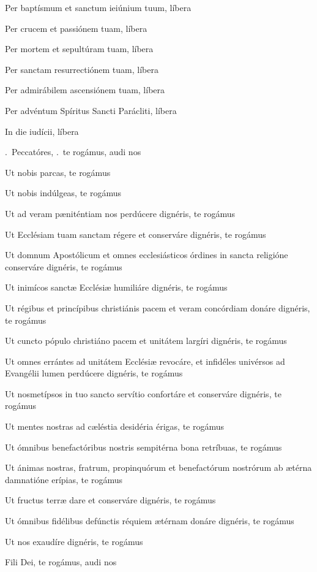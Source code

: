 \documentclass[12pt,a6paper]{book}
\makeatletter
\DeclareRobustCommand{\V}{\textbf{\vers@resp{-0.1em}{V}}.~}
\DeclareRobustCommand{\R}{\textbf{\vers@resp{0pt}{R}}.~}
\newcommand{\vers@resp@sym}{\raisebox{0.2ex}{\rotatebox[origin=c]{-20}{$\m@th\rceil$}}}
\newcommand{\vers@resp}[2]{%
  {\ooalign{\hidewidth\kern#1\vers@resp@sym\hidewidth\cr#2\cr}}%
}
\makeatother
\begin{document}
\begin{sloppy}
Per baptísmum et sanctum ieiúnium tuum, líbera

Per crucem et passiónem tuam, líbera

Per mortem et sepultúram tuam, líbera

Per sanctam resurrectiónem tuam, líbera

Per admirábilem ascensiónem tuam, líbera

Per advéntum Spíritus Sancti Parácliti, líbera

In die iudícii, líbera

\vspace{3mm}

\V Peccatóres, 
\R te rogámus, audi nos

Ut nobis parcas, te rogámus

Ut nobis indúlgeas, te rogámus

Ut ad veram pæniténtiam nos perdúcere dignéris, te rogámus

Ut Ecclésiam tuam sanctam régere et conserváre dignéris, te rogámus

Ut domnum Apostólicum et omnes ecclesiásticos órdines in sancta religióne conserváre dignéris, te 
rogámus

Ut inimícos sanctæ Ecclésiæ humiliáre dignéris, te rogámus

Ut régibus et princípibus christiánis pacem et veram concórdiam donáre dignéris, te rogámus

Ut cuncto pópulo christiáno pacem et unitátem largíri dignéris, te rogámus

Ut omnes errántes ad unitátem Ecclésiæ revocáre, et infidéles univérsos ad Evangélii lumen 
perdúcere dignéris, te rogámus

Ut nosmetípsos in tuo sancto servítio confortáre et conserváre dignéris, te rogámus

Ut mentes nostras ad cæléstia desidéria érigas, te rogámus

Ut ómnibus benefactóribus nostris sempitérna bona retríbuas, te rogámus

Ut ánimas nostras, fratrum, propinquórum et benefactórum nostrórum ab ætérna damnatióne erípias, te rogámus

Ut fructus terræ dare et conserváre dignéris, te rogámus

Ut ómnibus fidélibus defúnctis réquiem ætérnam donáre dignéris, te rogámus

Ut nos exaudíre dignéris, te rogámus

Fili Dei, te rogámus, audi nos

\vspace{3mm}


\end{sloppy}
\end{document}
